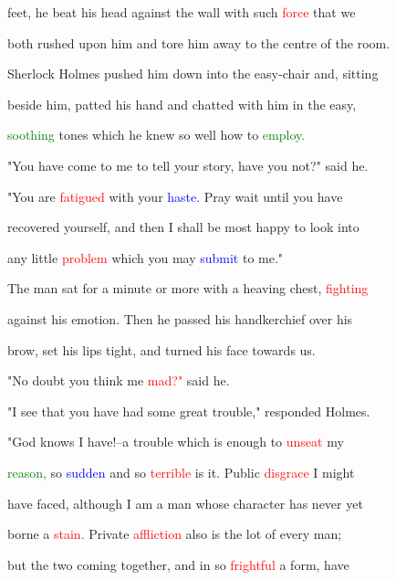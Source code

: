  feet, he beat his head against the wall with such \textcolor{red}{force} that we

 both rushed upon him and tore him away to the centre of the room.

 Sherlock Holmes pushed him down into the easy-chair and, sitting

 beside him, patted his hand and chatted with him in the easy,

 \textcolor{green}{soothing} tones which he knew so well how to \textcolor{green}{employ.}



 "You have come to me to tell your story, have you not?" said he.

 "You are \textcolor{red}{fatigued} with your \textcolor{blue}{haste.} \textcolor{BurntOrange}{Pray} \textcolor{BurntOrange}{wait} until you have

 recovered yourself, and then I shall be most \textcolor{BurntOrange}{happy} to look into

 any little \textcolor{red}{problem} which you may \textcolor{blue}{submit} to me."



 The man sat for a minute or more with a heaving chest, \textcolor{red}{fighting}

 against his emotion. Then he passed his handkerchief over his

 brow, set his lips tight, and turned his face towards us.



 "No \textcolor{BurntOrange}{doubt} you think me \textcolor{red}{mad?"} said he.



 "I see that you have had some great trouble," responded Holmes.



 \textcolor{BurntOrange}{"God} knows I have!--a trouble which is enough to \textcolor{red}{unseat} my

 \textcolor{green}{reason,} so \textcolor{blue}{sudden} and so \textcolor{red}{terrible} is it. \textcolor{BurntOrange}{Public} \textcolor{red}{disgrace} I might

 have faced, although I am a man whose character has never yet

 borne a \textcolor{red}{stain.} Private \textcolor{red}{affliction} also is the lot of every man;

 but the two coming together, and in so \textcolor{red}{frightful} a form, have

